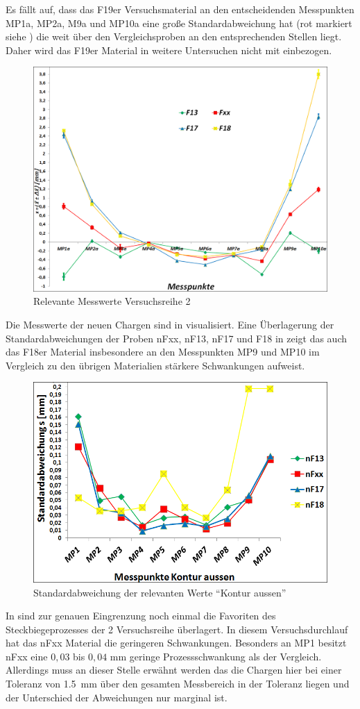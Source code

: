 \documentclass[12pt,a4paper,parskip]{scrartcl}
\begin{document}
Es fällt auf, dass das F19er Versuchsmaterial an den entscheidenden Messpunkten MP1a, MP2a, M9a und MP10a eine große Standardabweichung hat (rot markiert siehe ) die weit über den Vergleichsproben an den entsprechenden Stellen liegt. Daher wird das F19er Material in weitere Untersuchen nicht mit einbezogen.
\begin{figure}[hbtp]
\centering
\includegraphics[width=.8\textwidth]{messwerte2}
\caption{Relevante Messwerte Versuchsreihe 2}
\label{fig:messw2}
\end{figure}
Die Messwerte der neuen Chargen sind in  visualisiert. Eine Überlagerung der Standardabweichungen der Proben nFxx, nF13, nF17 und F18  in  zeigt das auch das F18er Material insbesondere an den Messpunkten MP9 und MP10 im Vergleich zu den übrigen Materialien stärkere Schwankungen aufweist.
\begin{figure}[hbtp]
\centering
\includegraphics[width=.8\textwidth]{standardxx131718}
\caption{Standardabweichung der relevanten Werte "`Kontur aussen"'}
\label{fig:standard123}
\end{figure}
In  sind zur genauen Eingrenzung noch einmal die Favoriten des Steckbiegeprozesses der 2 Versuchsreihe überlagert. In diesem Versuchsdurchlauf hat das nFxx Material die geringeren Schwankungen. Besonders an MP1 besitzt nFxx  eine $ 0,03 $ bis $ 0,04 $  mm geringe Prozessschwankung  als der Vergleich. Allerdings muss an dieser Stelle erwähnt werden das die Chargen hier bei einer Toleranz von \SI{1,5}{mm} über den gesamten Messbereich in der Toleranz liegen und der Unterschied  der  Abweichungen nur marginal ist. 
\end{document}
